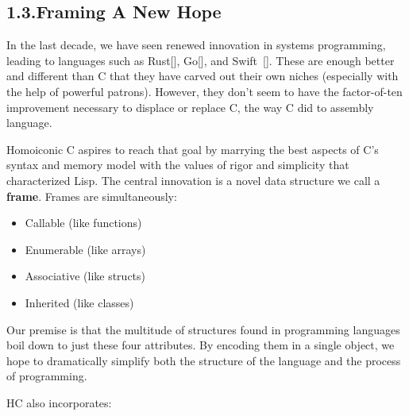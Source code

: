 \documentclass[preprint]{{acmart}}
\begin{document}
\subsection{1.3.\hspace*{0.5em}Framing A New Hope}\label{sec-frames}%

\noindent{}In the last decade, we have seen renewed innovation in systems
programming, leading to languages such as Rust[], Go[], and
Swift~{}[]. These are enough better and different than C that they
have carved out their own niches (especially with the help of powerful
patrons). However, they don't seem to have the factor-of-ten improvement
necessary to displace or replace C, the way C did to assembly language.%

Homoiconic C aspires to reach that goal by marrying the best aspects of
C's syntax and memory model with the values of rigor and simplicity that
characterized Lisp. The central innovation is a novel data structure we
call a \textbf{frame}. Frames are simultaneously:%

\begin{itemize}[noitemsep,topsep=\mdcompacttopsep]%

\item{}Callable (like functions)%

\item{}Enumerable (like arrays)%

\item{}Associative (like structs)%

\item{}Inherited (like classes)%
\end{itemize}%

\noindent{}Our premise is that the multitude of structures found in programming
languages boil down to just these four attributes. By encoding
them in a single object, we hope to dramatically simplify both the structure
of the language and the process of programming.%

HC also incorporates:%
\end{document}
